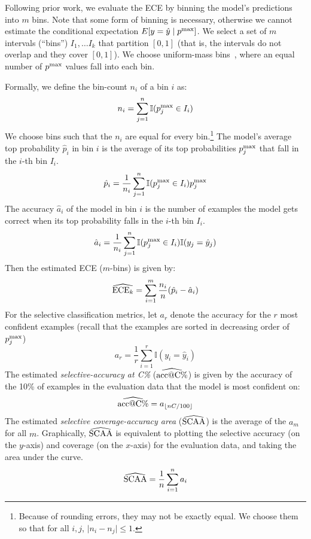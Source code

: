 Following prior work, we evaluate the ECE by binning the model's predictions into $m$ bins.
Note that some form of binning is necessary, otherwise we cannot estimate the conditional expectation $E[y = \hat{y} \mid p^{\sf{\max}}]$.
We select a set of $m$ intervals (``bins'') $I_1, \ldots I_k$ that partition $[0, 1]$ (that is, the intervals do not overlap and they cover $[0, 1]$).
We choose uniform-mass bins~\citep{kumar2019calibration}, where an equal number of $p^{\sf{\max}}$ values fall into each bin.

Formally, we define the bin-count $n_i$ of a bin $i$ as:
\begin{equation}
n_i = \sum_{j=1}^n \mathbb{I}( p^{\sf{\max}}_j \in I_i )
\end{equation}
We choose bins such that the $n_i$ are equal for every bin.\footnote{Because of rounding errors, they may not be exactly equal. We choose them so that for all $i, j$, $\lvert n_i - n_j \rvert \leq 1$.}
The model's average top probability $\hat{p}_i$ in bin $i$ is the average of its top probabilities $p^{\sf{\max}}_j$ that fall in the $i$-th bin $I_i$.
\begin{equation}
\hat{p}_i = \frac{1}{n_i} \sum_{j=1}^n \mathbb{I}( p^{\sf{\max}}_j \in I_i ) p^{\sf{\max}}_j
\end{equation}
The accuracy $\hat{a}_i$ of the model in bin $i$ is the number of examples the model gets correct when its top probability falls in the $i$-th bin $I_i$.
\begin{equation}
\hat{a}_i = \frac{1}{n_i} \sum_{j=1}^n \mathbb{I}( p^{\sf{\max}}_j \in I_i ) \mathbb{I}(y_j = \hat{y}_j)
\end{equation}
Then the estimated ECE ($m$-bins) is given by:
\begin{equation}
\widehat{\mbox{ECE}_k} = \sum_{i=1}^m \frac{n_i}{n} (\hat{p}_i - \hat{a}_i)
\end{equation}
For the selective classification metrics, let $a_r$ denote the accuracy for the $r$ most confident examples (recall that the examples are sorted in decreasing order of $p^{\sf{\max}}_j$)
\begin{equation}
a_r = \frac{1}{r} \sum_{i=1}^r \mathbb{I}(y_i = \hat{y}_i)
\end{equation}
The estimated \emph{selective-accuracy at C\%} ($\widehat{\mbox{acc@C\%}}$) is given by the accuracy of the 10\% of examples in the evaluation data that the model is most confident on:
\begin{equation}
\widehat{\mbox{acc@C\%}} = a_{\lfloor nC/100 \rfloor}
\end{equation}
The estimated \emph{selective coverage-accuracy area} ($\widehat{\mbox{SCAA}}$) is the average of the $a_m$ for all $m$. Graphically, $\widehat{\mbox{SCAA}}$ is equivalent to plotting the selective accuracy (on the $y$-axis) and coverage (on the $x$-axis) for the evaluation data, and taking the area under the curve.
\begin{equation}
\widehat{\mbox{SCAA}} = \frac{1}{n}\sum_{i=1}^n a_i
\end{equation}

